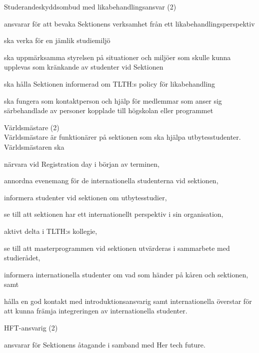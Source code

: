\documentclass[10pt]{article}
\begin{document}
\begin{emptylist}
    \item Studerandeskyddsombud med likabehandlingsansvar (2)
        \begin{dashlist}
            \item ansvarar för att bevaka Sektionens verksamhet från ett likabehandlingsperspektiv
            \item ska verka för en jämlik studiemiljö
            \item ska uppmärksamma styrelsen på situationer och miljöer som skulle kunna upplevas som kränkande av studenter vid Sektionen
            \item ska hålla Sektionen informerad om TLTH:s policy för likabehandling
            \item ska fungera som kontaktperson och hjälp för medlemmar som anser sig särbehandlade av personer kopplade till högskolan eller programmet
        \end{dashlist}
    \item Världsmästare (2) \\
    	Världsmästare är funktionärer på sektionen som ska hjälpa utbytesstudenter. Världsmästaren ska
    	 \begin{dashlist}
    		\item närvara vid Registration day i början av terminen,
    		\item annordna evenemang för de internationella studenterna vid sektionen,
    		\item informera studenter vid sektionen om utbytesstudier,
    		\item se till att sektionen har ett internationellt perspektiv i sin organisation,
    		\item aktivt delta i TLTH:s kollegie,
    		\item se till att masterprogrammen vid sektionen utvärderas i sammarbete med studierådet,
    		\item informera internationella studenter om vad som händer på kåren och sektionen, samt
    		\item hålla en god kontakt med introduktionsansvarig samt internationella överstar för att kunna främja integreringen av internationella studenter.
        \end{dashlist}
    \item HFT-ansvarig (2)
        \begin{dashlist}
            \item ansvarar för Sektionens åtagande i samband med Her tech future.
        \end{dashlist}
\end{emptylist}
\end{document}
